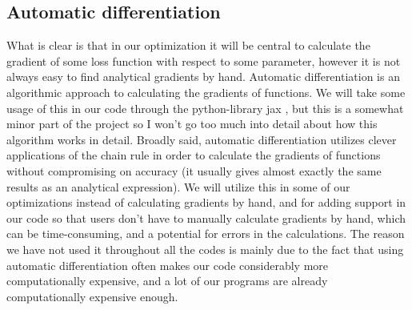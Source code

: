\documentclass{article}
\begin{document}
\subsection{Automatic differentiation}
What is clear is that in our optimization it will be central to calculate the
gradient of some loss function with respect to some parameter, however it is not
always easy to find analytical gradients by hand. Automatic differentiation is
an algorithmic approach to calculating the gradients of functions. We will take
some usage of this in our code through the python-library jax
\cite{githubrepojax}, but this is a somewhat minor part of the project so I
won't go too much into detail about how this algorithm works in detail. Broadly
said, automatic differentiation utilizes clever applications of the chain rule
in order to calculate the gradients of functions without compromising on
accuracy (it usually gives almost exactly the same results as an analytical
expression).  We will utilize this in some of our optimizations instead of
calculating gradients by hand, and for adding support in our code so that users
don't have to manually calculate gradients by hand, which can be time-consuming,
and a potential for errors in the calculations. The reason we have not used it
throughout all the codes is mainly due to the fact that using automatic
differentiation often makes our code considerably more computationally
expensive, and a lot of our programs are already computationally expensive
enough.
\end{document}
